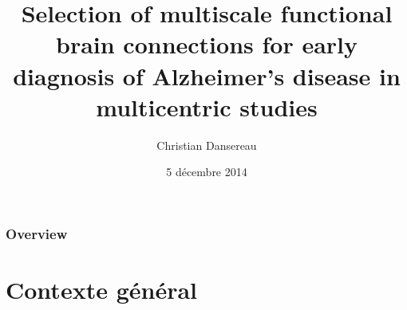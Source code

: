 \documentclass{beamer}
\title[Connectivity for early diagnosis of AD]{Selection of multiscale functional brain connections for early diagnosis of Alzheimer's disease in multicentric studies} %
\author{Christian Dansereau} %
\institute[DIRO] %
{
Université de Montréal \\ %
\medskip
}
\date{5 décembre 2014} %
\begin{document}
\begin{frame}
\titlepage %
\end{frame}

\begin{frame}
\frametitle{Overview} %
\tableofcontents %
\end{frame}


\section{Contexte général} 
\end{document}
